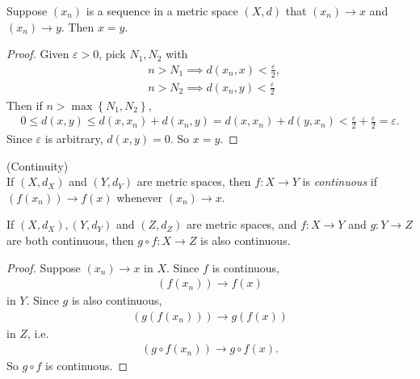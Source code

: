 \documentclass[a4paper]{article}
\begin{document}
\begin{prop}
Suppose $\left(x_n\right)$ is a sequence in a metric space $\left(X,d\right)$ that $\left(x_n\right) \to x$ and $\left(x_n\right) \to y$. Then $x=y$.
\begin{proof}
Given $\varepsilon>0$, pick $N_1,N_2$ with
\begin{equation*}
\begin{aligned}
&n>N_1 \implies d\left(x_n,x\right) < \frac{\varepsilon}{2},\\
&n>N_2 \implies d\left(x_n,y\right) < \frac{\varepsilon}{2}
\end{aligned}
\end{equation*}
Then if $n>\max\left\{N_1,N_2\right\}$,
\begin{equation*}
\begin{aligned}
0\leq d\left(x,y\right)\leq d\left(x,x_n\right) + d\left(x_n,y\right) = d\left(x,x_n\right) + d\left(y,x_n\right) < \frac{\varepsilon}{2} + \frac{\varepsilon}{2} = \varepsilon.
\end{aligned}
\end{equation*}
Since $\varepsilon$ is arbitrary, $d\left(x,y\right)=0$. So $x=y$.
\end{proof}
\end{prop}

\begin{defi} (Continuity)\\
If $\left(X,d_X\right)$ and $\left(Y,d_Y\right)$ are metric spaces, then $f:X\to Y$ is \emph{continuous} if $\left(f\left(x_n\right)\right) \to f\left(x\right)$ whenever $\left(x_n\right) \to x$.
\end{defi}

\begin{prop}
If $\left(X,d_X\right), \left(Y,d_Y\right)$ and $\left(Z,d_Z\right)$ are metric spaces, and $f:X\to Y$ and $g:Y\to Z$ are both continuous, then $g \circ f:X\to Z$ is also continuous.
\begin{proof}
Suppose $\left(x_n\right) \to x$ in $X$. Since $f$ is continuous, 
\begin{equation*}
\begin{aligned}
\left(f\left(x_n\right)\right) \to f\left(x\right)
\end{aligned}
\end{equation*}
in $Y$. Since $g$ is also continuous,
\begin{equation*}
\begin{aligned}
\left(g\left(f\left(x_n\right)\right)\right) \to g\left(f\left(x\right)\right)
\end{aligned}
\end{equation*}
in $Z$, i.e.
\begin{equation*}
\begin{aligned}
\left(g\circ f\left(x_n\right)\right) \to g\circ f\left(x\right).
\end{aligned}
\end{equation*}
So $g\circ f$ is continuous.
\end{proof}
\end{prop}
\end{document}
